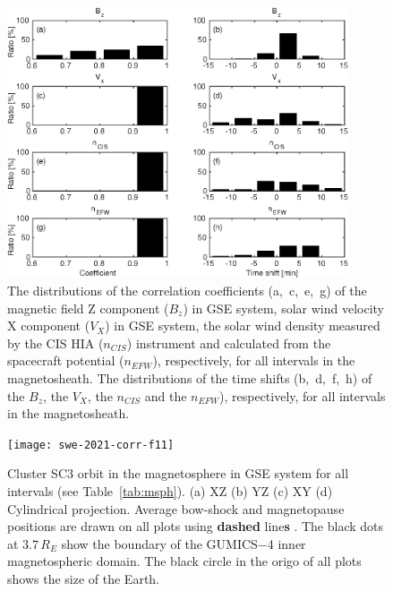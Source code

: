 \documentclass[linenumbers,draft]{agujournal}
\begin{document}
\begin{figure}[h]
\centering
\includegraphics[width=0.9\textwidth,angle=0]{swe-2021-corr-f10}
\caption{The distributions of the correlation coefficients (a,~c,~e,~g) of the magnetic field Z component ($B_z$) in GSE system, solar wind velocity X component ($V_X$) in GSE system, the solar wind density measured by the CIS HIA ($n_{CIS}$) instrument and calculated from the spacecraft potential ($n_{EFW}$), respectively, for all intervals in the magnetosheath. The distributions of the time shifts (b,~d,~f,~h) of the $B_z$, the $V_X$, the $n_{CIS}$ and the $n_{EFW}$), respectively, for all intervals in the magnetosheath.}
\label{fig:mshcorrplot}
\end{figure}

\pagebreak

\begin{figure}[h]
\centering
\texttt{[image: swe-2021-corr-f11]}  
\caption{Cluster SC3 orbit in the magnetosphere in GSE system for all intervals (see Table~\ref{tab:msph}). (a) XZ (b) YZ (c) XY (d) Cylindrical projection. Average bow-shock and magnetopause positions are drawn on all plots using \textbf{dashed} line\textbf{s} \citep[][respectively]{peredo95:_three_alfven_mach,tsyganenko95:_model_earth}. The black dots at $3.7\,R_E$ show the boundary of the GUMICS$-$4 inner magnetospheric domain. The black circle in the origo of all plots shows the size of the Earth.}
\label{fig:msphorbit}
\end{figure}

\pagebreak
\end{document}

